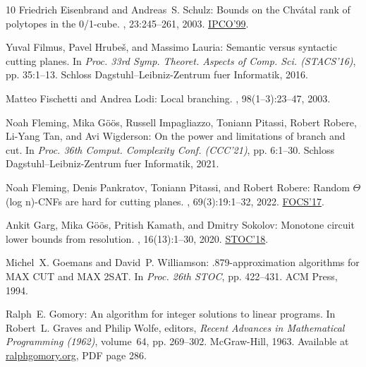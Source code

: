 \documentclass[11pt]{article}
\begin{document}
\begin{thebibliography}{10}
{\sc Friedrich Eisenbrand and Andreas~S. Schulz}: Bounds on the {C}hv{\'{a}}tal
  rank of polytopes in the 0/1-cube.
, 23:245--261, 2003.
\newblock \prelim \href{https://doi.org/10.1007/3-540-48777-8\_11}{IPCO'99}.
\newblock [\epfmtdoi{10.1007/s00493-003-0020-5}]

{\sc Yuval Filmus, Pavel Hrube{\v{s}}, and Massimo Lauria}: Semantic versus
  syntactic cutting planes.
\newblock In {\em Proc. 33rd Symp. Theoret. Aspects of Comp. Sci. (STACS'16)},
  pp. 35:1--13. Schloss Dagstuhl--Leibniz-Zentrum fuer Informatik, 2016.

{\sc Matteo Fischetti and Andrea Lodi}: Local branching.
, 98(1--3):23--47, 2003.
\newblock [\epfmtdoi{10.1007/s10107-003-0395-5}]

{\sc Noah Fleming, Mika G{\"{o}}{\"{o}}s, Russell Impagliazzo, Toniann Pitassi,
  Robert Robere, Li{-}Yang Tan, and Avi Wigderson}: On the power and
  limitations of branch and cut.
\newblock In {\em Proc. 36th Comput. Complexity Conf. (CCC'21)}, pp. 6:1--30.
  Schloss Dagstuhl--Leibniz-Zentrum fuer Informatik, 2021.

{\sc Noah Fleming, Denis Pankratov, Toniann Pitassi, and Robert Robere}: Random
  {\(\Theta\)}(log n)-{CNF}s are hard for cutting planes.
, 69(3):19:1--32, 2022.
\newblock \prelim \href{https://doi.org/10.1109/FOCS.2017.19}{FOCS'17}.
\newblock [\epfmtdoi{10.1145/3486680}]

{\sc Ankit Garg, Mika G{\"{o}}{\"{o}}s, Pritish Kamath, and Dmitry Sokolov}:
  Monotone circuit lower bounds from resolution.
, 16(13):1--30, 2020.
\newblock \prelim \href{https://doi.org/10.1145/3188745.3188838}{STOC'18}.

{\sc Michel~X. Goemans and David~P. Williamson}: .879-approximation algorithms
  for {MAX CUT} and {MAX 2SAT}.
\newblock In {\em Proc. 26th STOC}, pp. 422--431. ACM Press, 1994.
\newblock [\epfmtdoi{10.1145/195058.195216}]

{\sc Ralph~E. Gomory}: An algorithm for integer solutions to linear programs.
\newblock In {\sc Robert~L. Graves and Philip Wolfe}, editors, {\em Recent
  Advances in Mathematical Programming (1962)}, volume~64, pp. 269--302.
  McGraw-Hill, 1963.
\newblock Available at
  \href{https://ralphgomory.org/wp-content/uploads/2023/02/Algorithm\_for\_integer-1.pdf}{ralphgomory.org},
  PDF page 286.


\end{thebibliography}
\end{document}
